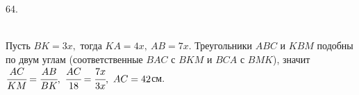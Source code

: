 64. \begin{figure}[ht!]
\end{figure}\\
Пусть $BK=3x,$ тогда $KA=4x,\ AB=7x.$ Треугольники $ABC$ и $KBM$ подобны по двум углам (соответственные $BAC$ с $BKM$ и $BCA$ с $BMK$), значит $\cfrac{AC}{KM}=\cfrac{AB}{BK},\ \cfrac{AC}{18}=\cfrac{7x}{3x},\ AC=42$см.\\
